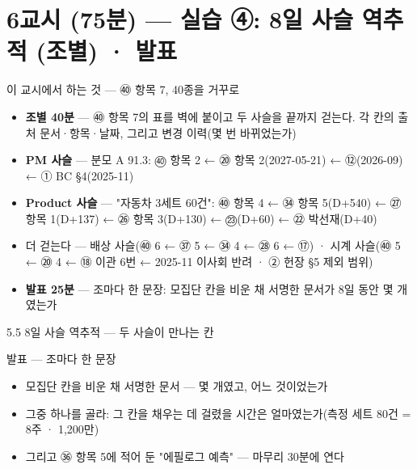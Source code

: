 \section{6교시 (75분) — 실습 ④: 8일 사슬 역추적 (조별) · 발표}
\begin{frame}{이 교시에서 하는 것 — ㊵ 항목 7, 40종을 거꾸로}
\begin{itemize}
\item \textbf{조별 40분} — ㊵ 항목 7의 표를 벽에 붙이고 두 사슬을 끝까지 걷는다. 각 칸의 출처 문서·항목·날짜, 그리고 변경 이력(몇 번 바뀌었는가)
\item \textbf{PM 사슬} — 분모 A 91.3: ㊵ 항목 2 ← ⑳ 항목 2(2027-05-21) ← ⑫(2026-09) ← ① BC §4(2025-11)
\item \textbf{Product 사슬} — "자동차 3세트 60건": ㊵ 항목 4 ← ㉞ 항목 5(D+540) ← ㉗ 항목 1(D+137) ← ㉖ 항목 3(D+130) ← ㉓(D+60) ← ㉒ 박선재(D+40)
\item 더 걷는다 — 배상 사슬(㊵ 6 ← ㊲ 5 ← ㉞ 4 ← ㉘ 6 ← ⑰) · 시계 사슬(㊵ 5 ← ⑳ 4 ← ⑱ 이관 6번 ← 2025-11 이사회 반려 · ② 헌장 §5 제외 범위)
\item \textbf{발표 25분} — 조마다 한 문장: 모집단 칸을 비운 채 서명한 문서가 8일 동안 몇 개였는가
\end{itemize}
\end{frame}

\begin{frame}{5.5 8일 사슬 역추적 — 두 사슬이 만나는 칸}
\end{frame}

\begin{frame}{발표 — 조마다 한 문장}
\begin{itemize}
\item 모집단 칸을 비운 채 서명한 문서 — 몇 개였고, 어느 것이었는가
\item 그중 하나를 골라: 그 칸을 채우는 데 걸렸을 시간은 얼마였는가(측정 세트 80건 = 8주 · 1,200만)
\item 그리고 ㊱ 항목 5에 적어 둔 "에필로그 예측" — 마무리 30분에 연다
\end{itemize}
\end{frame}

